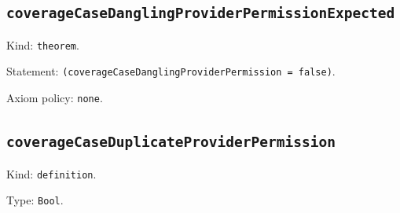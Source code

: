 \documentclass[11pt]{article}
\begin{document}
\subsection*{\texttt{coverageCaseDanglingProviderPermissionExpected}}
\noindent Kind: \texttt{theorem}.\par
\noindent Statement: \texttt{(coverageCaseDanglingProviderPermission = false)}.\par
\noindent Axiom policy: \texttt{none}.\par
\subsection*{\texttt{coverageCaseDuplicateProviderPermission}}
\noindent Kind: \texttt{definition}.\par
\noindent Type: \texttt{Bool}.\par
\end{document}
